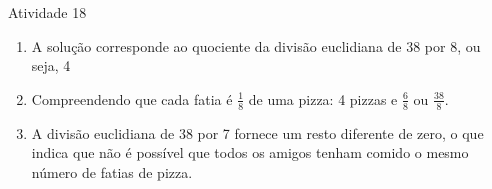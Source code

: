 \begin{multicols}{2}
\begin{resposta*}{Atividade 18}
\begin{enumerate} [\quad a)] %
    \item       A solução corresponde ao quociente da divisão euclidiana de 38 por 8, ou seja, 4
    \item       Compreendendo que cada fatia é       $\frac{1}{8}$ de uma pizza: 4 pizzas e       $\frac{6}{8}$ ou       $\frac{38}{8}$.
    \item       A divisão euclidiana de 38 por 7 fornece um resto diferente de zero, o que indica que não é possível que todos os amigos tenham comido o mesmo número de fatias de pizza.
\end{enumerate} %
\end{resposta*}


\end{multicols}
